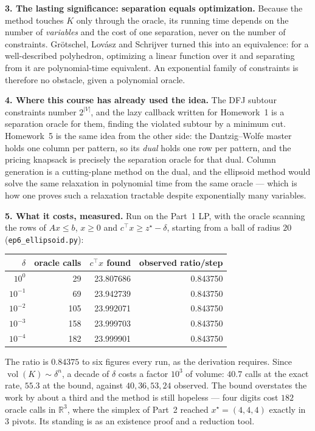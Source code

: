 \documentclass[10pt]{article}
\DeclareMathOperator{\vol}{vol}
\begin{document}
\textbf{3. The lasting significance: separation equals optimization.}
Because the method touches $K$ only through the oracle, its running
time depends on the number of \emph{variables} and the cost of one
separation, never on the number of constraints. Gr\"otschel, Lov\'asz
and Schrijver turned this into an equivalence: for a well-described
polyhedron, optimizing a linear function over it and separating from
it are polynomial-time equivalent. An exponential family of
constraints is therefore no obstacle, given a polynomial oracle.

\textbf{4. Where this course has already used the idea.}
The DFJ subtour constraints number $2^{|V|}$, and the lazy callback
written for Homework~1 is a separation oracle for them, finding the
violated subtour by a minimum cut. Homework~5 is the same idea from
the other side: the Dantzig--Wolfe master holds one column per
pattern, so its \emph{dual} holds one row per pattern, and the pricing
knapsack is precisely the separation oracle for that dual. Column
generation is a cutting-plane method on the dual, and the ellipsoid
method would solve the same relaxation in polynomial time from the
same oracle --- which is how one proves such a relaxation tractable
despite exponentially many variables.

\textbf{5. What it costs, measured.}
Run on the Part~1 LP, with the oracle scanning the rows of
$Ax \le b$, $x \ge 0$ and $c^{\!\top}x \ge z^\star - \delta$, starting
from a ball of radius $20$ (\texttt{ep6\_ellipsoid.py}):

\begin{center}\footnotesize
\setlength{\tabcolsep}{7pt}
\begin{tabular}{@{}rrrr@{}}
\toprule
$\delta$ & oracle calls & $c^{\!\top}x$ found & observed ratio/step\\
\midrule
$10^{0}$  &  29 & 23.807686 & 0.843750\\
$10^{-1}$ &  69 & 23.942739 & 0.843750\\
$10^{-2}$ & 105 & 23.992071 & 0.843750\\
$10^{-3}$ & 158 & 23.999703 & 0.843750\\
$10^{-4}$ & 182 & 23.999901 & 0.843750\\
\bottomrule
\end{tabular}
\end{center}

The ratio is $0.84375$ to six figures every run, as the derivation
requires. Since $\vol(K) \sim \delta^{n}$, a decade of $\delta$ costs a
factor $10^{3}$ of volume: $40.7$ calls at the exact rate, $55.3$ at
the bound, against $40, 36, 53, 24$ observed. The bound overstates the
work by about a third and the method is still hopeless --- four
digits cost $182$ oracle calls in $\mathbb{R}^3$, where the simplex of
Part~2 reached $x^\star = (4,4,4)$ exactly in $3$ pivots. Its standing
is as an existence proof and a reduction tool.
\end{document}

